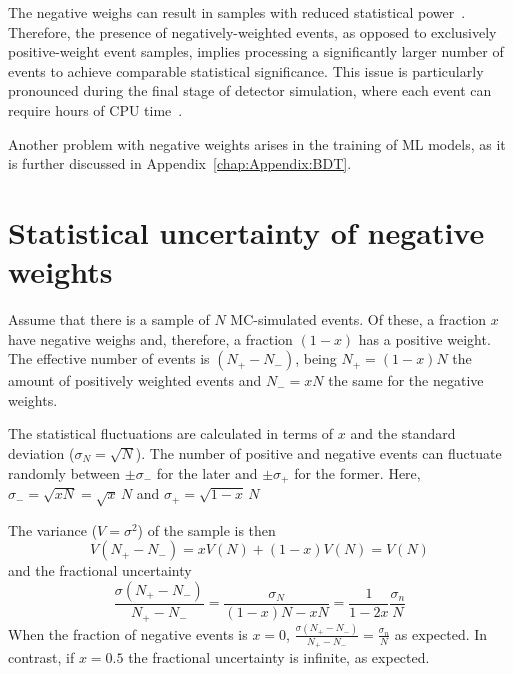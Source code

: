 
The negative weighs can result in samples with reduced statistical power~\cite{Danziger:2021xvr}.
Therefore, the presence of negatively-weighted events, as opposed to exclusively positive-weight 
event samples, implies processing a significantly larger number of events to achieve comparable 
statistical significance. This issue is particularly pronounced during the final stage of detector simulation, 
where each event can require hours of CPU time~\cite{Andersen:2021mvw}.

Another problem with negative weights arises in the training of ML models, as it is further discussed
in Appendix~\ref{chap:Appendix:BDT}. 



\section{Statistical uncertainty of negative weights}
\label{chap:Appendix:NegWeights:uncert}
Assume that there is a sample of $N$ MC-simulated events. Of these,
a fraction $x$ have negative weighs and, therefore, a fraction $(1-x)$ has a positive weight.
The effective number of events is $(N_{+} - N_{-})$, being $N_{+} = (1-x)N$ the amount of
positively weighted events and $N_{-} = xN$ the same for the negative weights.

The statistical fluctuations are calculated in terms of $x$ and the standard deviation 
($\sigma_{N}=\sqrt{N}$). The number of positive and negative events can fluctuate
randomly between $\pm \sigma_{-}$ for the later and  $\pm \sigma_{+}$ for the former.
Here, $\sigma_{-} = \sqrt{xN} = \sqrt{x}\,N$ and $\sigma_{+}= \sqrt{1-x}\,N$

The variance ($V=\sigma^{2}$) of the sample is then
\begin{equation*}%
	V(N_{+} - N_{-}) = xV(N) + (1-x)V(N)= V(N)
\end{equation*}
and the fractional uncertainty
\begin{equation*}%
	\frac{\sigma(N_{+} - N_{-})}{N_{+} - N_{-}} = \frac{\sigma_N}{(1-x)N - xN}
	= \frac{1}{1-2x}\frac{\sigma_n}{N}
\end{equation*}
When the fraction of negative events is $x=0$, $\frac{\sigma(N_{+} - N_{-})}{N_{+} - N_{-}}
= \frac{\sigma_n}{N}$ as expected. In contrast, if $x=0.5$ the fractional uncertainty is infinite,
as expected.

